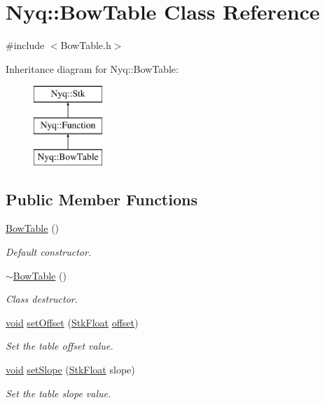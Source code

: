 \hypertarget{class_nyq_1_1_bow_table}{}\section{Nyq\+:\+:Bow\+Table Class Reference}
\label{class_nyq_1_1_bow_table}


{\ttfamily \#include $<$Bow\+Table.\+h$>$}

Inheritance diagram for Nyq\+:\+:Bow\+Table\+:\begin{figure}[H]
\begin{center}
\leavevmode
\includegraphics[height=3.000000cm]{class_nyq_1_1_bow_table}
\end{center}
\end{figure}
\subsection*{Public Member Functions}
\begin{DoxyCompactItemize}
\item 
\hyperlink{class_nyq_1_1_bow_table_afd66bc5f53ea3c49542c9a34ea4fb3ef}{Bow\+Table} ()
\begin{DoxyCompactList}\small\item\em Default constructor. \end{DoxyCompactList}\item 
\hyperlink{class_nyq_1_1_bow_table_a271d2e97bf4ba1ac70410a0435b033bd}{$\sim$\+Bow\+Table} ()
\begin{DoxyCompactList}\small\item\em Class destructor. \end{DoxyCompactList}\item 
\hyperlink{sound_8c_ae35f5844602719cf66324f4de2a658b3}{void} \hyperlink{class_nyq_1_1_bow_table_a6ef43e3d82a772278cea5c55c0455697}{set\+Offset} (\hyperlink{namespace_nyq_a044fa20a706520a617bbbf458a7db7e4}{Stk\+Float} \hyperlink{layer12_8c_a33d71f23ba2052d17f0b754dc35265b0}{offset})
\begin{DoxyCompactList}\small\item\em Set the table offset value. \end{DoxyCompactList}\item 
\hyperlink{sound_8c_ae35f5844602719cf66324f4de2a658b3}{void} \hyperlink{class_nyq_1_1_bow_table_aaefc0abbb0aff98ef52bdea79511e519}{set\+Slope} (\hyperlink{namespace_nyq_a044fa20a706520a617bbbf458a7db7e4}{Stk\+Float} slope)
\begin{DoxyCompactList}\small\item\em Set the table slope value. \end{DoxyCompactList}\end{DoxyCompactItemize}
